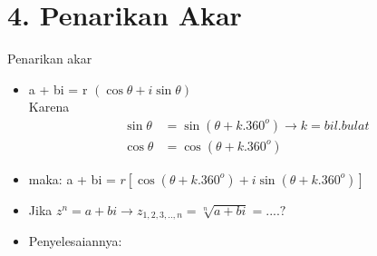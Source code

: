 \documentclass{beamer}
\begin{document}
\section{4. Penarikan Akar}
\begin{frame}[t, fragile]{Penarikan akar}
\begin{itemize}
\item a + bi = r $(\cos \theta + i \sin \theta)$ \\
Karena 
\begin{align}
     \sin \theta& = \sin (\theta + k.360^o) \rightarrow  k= bil. bulat \\
     \cos \theta& = \cos (\theta + k.360^o) 
\end{align}
\item maka: a + bi = $r [\cos(\theta + k.360^o) + i \sin(\theta+ k.360^o)]$
\item Jika $z^n = a + bi \rightarrow z_{1,2,3,..,n}= \sqrt[n]{a+bi} = ....?$
\item Penyelesaiannya:
\end{itemize}
\hskip22pt 
\end{frame}
\end{document}
